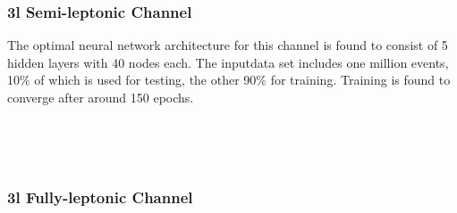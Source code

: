 
\subsubsection{3l Semi-leptonic Channel}
\label{subsec:pt3lS}



The optimal neural network architecture for this channel is found to consist of 5 hidden layers with 40 nodes each. The inputdata set includes one million events, 10\% of which is used for testing, the other 90\% for training. Training is found to converge after around 150 epochs.
                                                                                                                             
\begin{figure}[h!]
    \\                     
    \caption{}
    \label{fig:pt3lSresults}
\end{figure}

\begin{figure}[h!]                                                                                                           
    \\
    \caption{}
    \label{fig:pt3lSroc}
\end{figure}


\subsubsection{3l Fully-leptonic Channel}
\label{subsec:pt3lF}

